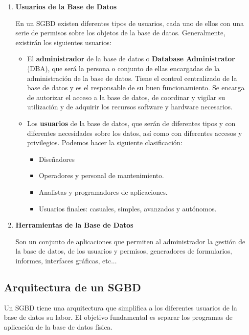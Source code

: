 \begin{enumerate}
    \item \textbf{Usuarios de la Base de Datos}

    En un SGBD existen diferentes tipos de usuarios, cada uno de ellos con una serie de permisos sobre los objetos de la base de datos. Generalmente, existirán los siguientes usuarios:

    \begin{itemize}
        \item El \textbf{administrador} de la base de datos o \textbf{Database Administrator} (DBA), que será la persona o conjunto de ellas encargadas de la administración de la base de datos. Tiene el control centralizado de la base de datos y es el responsable de su buen funcionamiento. Se encarga de autorizar el acceso a la base de datos, de coordinar y vigilar su utilización y de adquirir los recursos software y hardware necesarios.

        \item Los \textbf{usuarios} de la base de datos, que serán de diferentes tipos y con diferentes necesidades sobre los datos, así como con diferentes accesos y privilegios. Podemos hacer la siguiente clasificación:

        \begin{itemize}
            \item Diseñadores
            \item Operadores y personal de mantenimiento.
            \item Analistas y programadores de aplicaciones.
            \item Usuarios finales: casuales, simples, avanzados y autónomos.
        \end{itemize}
    \end{itemize}

    \item \textbf{Herramientas de la Base de Datos}

    Son un conjunto de aplicaciones que permiten al administrador la gestión de la base de datos, de los usuarios y permisos, generadores de formularios, informes, interfaces gráficas, etc...
\end{enumerate}

\subsection{Arquitectura de un SGBD}
Un SGBD tiene una arquitectura que simplifica a los diferentes usuarios de la base de datos su labor. El objetivo fundamental es separar los programas de aplicación de la base de datos física.

